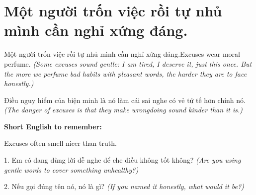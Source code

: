\section{Một người trốn việc rồi tự nhủ mình cần nghỉ xứng đáng.}
\begin{truyen}{Một người trốn việc rồi tự nhủ mình cần nghỉ xứng đáng.}{Excuses wear moral perfume.}
\textit{(Some excuses sound gentle: I am tired, I deserve it, just this once. But the more we perfume bad habits with pleasant words, the harder they are to face honestly.)}
\end{truyen}
\begin{baihoc}
Điều nguy hiểm của biện minh là nó làm cái sai nghe có vẻ tử tế hơn chính nó.
\textit{(The danger of excuses is that they make wrongdoing sound kinder than it is.)}
\end{baihoc}
\begin{ghinhoanh}\textbf{Short English to remember:}

Excuses often smell nicer than truth.
\end{ghinhoanh}
\begin{tuhocnhanh}
1. Em có đang dùng lời dễ nghe để che điều không tốt không? \textit{(Are you using gentle words to cover something unhealthy?)}

2. Nếu gọi đúng tên nó, nó là gì? \textit{(If you named it honestly, what would it be?)}
\end{tuhocnhanh}
\ngancach

